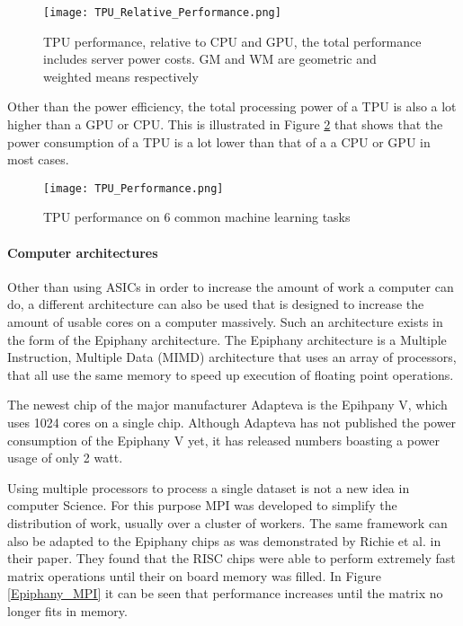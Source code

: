 \begin{figure}
  \texttt{[image: TPU\_Relative\_Performance.png]}
  \caption{TPU performance, relative to CPU and GPU, the total performance includes server power costs. GM and WM are geometric and weighted means respectively \cite{Joup17}}
  \label{TPU_Relative_Performance}
\end{figure}

Other than the power efficiency, the total processing power of a TPU is also a lot higher
than a GPU or CPU. This is illustrated in Figure \ref{TPU_Performance} that shows that the 
power consumption of a TPU is a lot lower than that of a a CPU or GPU in most cases.

\begin{figure}
  \texttt{[image: TPU\_Performance.png]}
  \caption{TPU performance on 6 common machine learning tasks\cite{Sato17}}
  \label{TPU_Performance}
\end{figure}


\paragraph{Computer architectures}
Other than using ASICs in order to increase the amount of work a computer can do,
a different architecture can also be used that is designed to increase the amount
of usable cores on a computer massively. Such an architecture exists in the form
of the Epiphany architecture. The Epiphany architecture is a Multiple Instruction,
Multiple Data (MIMD) architecture that uses an array of processors, that all use the
same memory to speed up execution of floating point operations\cite{Olof16}.

The newest chip of the major manufacturer Adapteva is the Epihpany V, which uses
1024 cores on a single chip\cite{Olof16}. Although Adapteva has not published the power consumption of the Epiphany V yet,
it has released numbers boasting a power usage of only 2 watt\cite{Adap}.

Using multiple processors to process a single dataset is not a new idea in computer
Science. For this purpose MPI was developed to simplify the distribution of work,
usually over a cluster of workers. The same framework can also be adapted to the
Epiphany chips as was demonstrated by Richie et al. in their paper. They found that
the RISC chips were able to perform extremely fast matrix operations until their on board
memory was filled\cite{Rich15}. In Figure \ref{Epiphany_MPI} it can be seen that performance increases
until the matrix no longer fits in memory.

